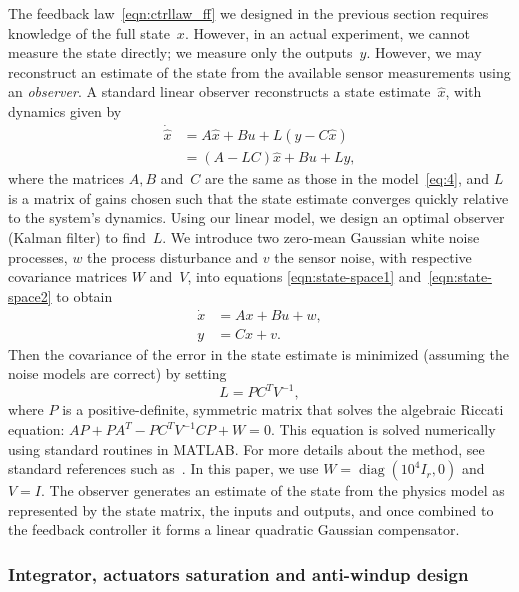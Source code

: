 \documentclass[12pt,lot, lof]{puthesis}
\begin{document}
The feedback law~\eqref{eqn:ctrllaw_ff} we designed in the previous section requires knowledge of the full state~$x$.  However, in an actual experiment, we cannot measure the state directly; we measure only the outputs~$y$.  However, we may reconstruct an estimate of the state from the available sensor measurements using an {\em observer}.
A standard linear observer reconstructs a state estimate~$\hat x$, with dynamics given by
\begin{equation}
	\begin{split}
		\dot{\hat{x}} &=  A \hat{x} + B u + L (y - C \hat{x}) \\
			&= (A- L C) \hat{x} + B u + L y,
		\label{obs}
	\end{split}
\end{equation}
where the matrices $A,B$ and~$C$ are the same as those in the model~\eqref{eq:4}, and $L$ is a matrix of gains chosen such that the state estimate converges quickly relative to the system's dynamics.
Using our linear model, we design an optimal observer (Kalman filter) to find~$L$.
We introduce two zero-mean Gaussian white noise processes, $w$ the process disturbance and $v$ the sensor noise, with respective covariance matrices $W$ and~$V$, into equations \eqref{eqn:state-space1} and~\eqref{eqn:state-space2} to obtain
\begin{align}
	\dot{x} &= A x + B u + w, \label{eqn:state-space-noise1} \\
	y &= C x + v. \label{eqn:state-space-noise2}
\end{align}
Then the covariance of the error in the state estimate is minimized (assuming the noise models are correct) by setting
\begin{equation}
	L = P C^T V^{-1},
\end{equation}
where $P$ is a positive-definite, symmetric matrix that solves the algebraic Riccati equation: $A {P} + P {A}^T - P {C}^T V^{-1} C P + W = 0$.  This equation is solved numerically using standard routines in MATLAB. For more details about the method, see standard references such as~\cite{SandP, AandM}.
In this paper, we use $W= \operatorname{diag}(10^{4}I_r, 0)$ and $V= I$.
The observer generates an estimate of the state from the physics model as represented by the state matrix, the inputs and outputs, and once combined to the feedback controller it forms a linear quadratic Gaussian compensator.

\subsubsection{Integrator, actuators saturation and anti-windup design} 
\end{document}
